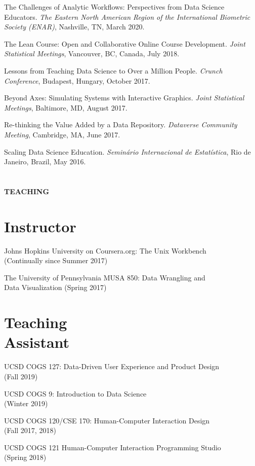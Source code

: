 \begin{innerlist}
\item The Challenges of Analytic Workflows: Perspectives from Data Science Educators. \textit{The Eastern North American Region of the International Biometric Society (ENAR)}, Nashville, TN, March 2020.
\item The Lean Course: Open and Collaborative Online Course Development. \textit{Joint Statistical Meetings}, Vancouver, BC, Canada, July 2018.
\item Lessons from Teaching Data Science to Over a Million People. \textit{Crunch Conference}, Budapest, Hungary, October 2017.
\item Beyond Axes: Simulating Systems with Interactive Graphics. \textit{Joint Statistical Meetings}, Baltimore, MD, August 2017.
\item Re-thinking the Value Added by a Data Repository. \textit{Dataverse Community Meeting}, Cambridge, MA, June 2017.
\item Scaling Data Science Education. \textit{Seminário Internacional de Estatística}, Rio de Janeiro, Brazil, May 2016.
\end{innerlist}


\section{} \textbf{TEACHING} \vspace{-0.05in}

\section{Instructor}

\begin{innerlist}
\item Johns Hopkins University on Coursera.org: The Unix Workbench \\ (Continually since Summer 2017)
\item The University of Pennsylvania MUSA 850: Data Wrangling and \\ Data Visualization (Spring 2017)
\end{innerlist}

\section{Teaching\\Assistant}

\begin{innerlist}
\item UCSD COGS 127: Data-Driven User Experience and Product Design  \\ (Fall 2019)
\item UCSD COGS 9: Introduction to Data Science  \\ (Winter 2019)
\item UCSD COGS 120/CSE 170: Human-Computer Interaction Design \\ (Fall 2017, 2018)
\item UCSD COGS 121 Human-Computer Interaction Programming Studio \\ (Spring 2018)
\end{innerlist}

